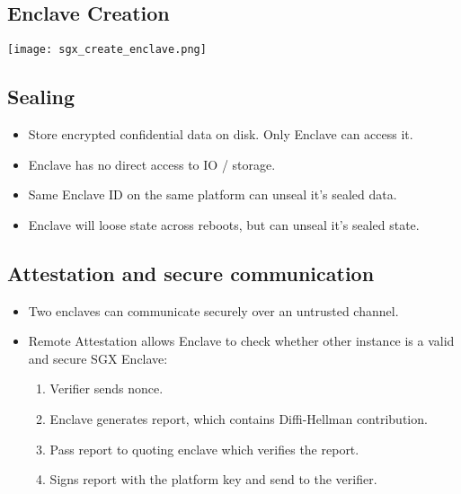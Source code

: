 \subsection{Enclave Creation}
\begin{center}
  \texttt{[image: sgx\_create\_enclave.png]}
\end{center}

\subsection{Sealing}
\begin{itemize}
  \item Store encrypted confidential data on disk. Only Enclave can access it.
  \item Enclave has no direct access to IO / storage.
  \item Same Enclave ID on the same platform can unseal it's sealed data.
  \item Enclave will loose state across reboots, but can unseal it's sealed
    state.
\end{itemize}


\subsection{Attestation and secure communication}
\begin{itemize}
  \item Two enclaves can communicate securely over an untrusted channel.
  \item Remote Attestation allows Enclave to check whether other instance is a
    valid and secure SGX Enclave:
    \begin{enumerate}
      \item Verifier sends nonce.
      \item Enclave generates report, which contains Diffi-Hellman contribution.
      \item Pass report to quoting enclave which verifies the report.
      \item Signs report with the platform key and send to the verifier.
    \end{enumerate}
\end{itemize}

